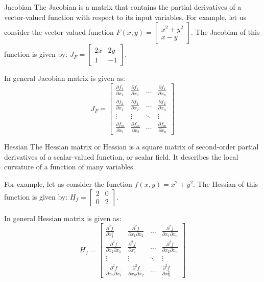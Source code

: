 \documentclass[handout]{beamer}
\begin{document}
\begin{frame}{Jacobian}
    The Jacobian is a matrix that contains the partial derivatives of a vector-valued function with respect to its input variables. 
For example, let us consider the vector valued function $F(x, y) = \begin{bmatrix} x^2 + y^2 \\ x - y \end{bmatrix}$. The Jacobian of this function is given by: $J_F = \begin{bmatrix} 2x & 2y \\ 1 & -1 \end{bmatrix}$.

In general Jacobian matrix is given as:
\begin{equation*}
    J_F = \begin{bmatrix} \frac{\partial f_1}{\partial x_1} & \frac{\partial f_1}{\partial x_2} & \dots & \frac{\partial f_1}{\partial x_n} \\ \frac{\partial f_2}{\partial x_1} & \frac{\partial f_2}{\partial x_2} & \dots & \frac{\partial f_2}{\partial x_n} \\ \vdots & \vdots & \ddots & \vdots \\ \frac{\partial f_m}{\partial x_1} & \frac{\partial f_m}{\partial x_2} & \dots & \frac{\partial f_m}{\partial x_n} \end{bmatrix}
\end{equation*}

\end{frame}

\begin{frame}{Hessian}
    The Hessian matrix or Hessian is a square matrix of second-order partial derivatives of a scalar-valued function, or scalar field. It describes the local curvature of a function of many variables.

For example, let us consider the function $f(x, y) = x^2 + y^2$. The Hessian of this function is given by: $H_f = \begin{bmatrix} 2 & 0 \\ 0 & 2 \end{bmatrix}$.

In general Hessian matrix is given as:
\begin{equation*}
    H_f = \begin{bmatrix} \frac{\partial^2 f}{\partial x_1^2} & \frac{\partial^2 f}{\partial x_1 \partial x_2} & \dots & \frac{\partial^2 f}{\partial x_1 \partial x_n} \\ \frac{\partial^2 f}{\partial x_2 \partial x_1} & \frac{\partial^2 f}{\partial x_2^2} & \dots & \frac{\partial^2 f}{\partial x_2 \partial x_n} \\ \vdots & \vdots & \ddots & \vdots \\ \frac{\partial^2 f}{\partial x_n \partial x_1} & \frac{\partial^2 f}{\partial x_n \partial x_2} & \dots & \frac{\partial^2 f}{\partial x_n^2} \end{bmatrix}
\end{equation*}

    
\end{frame}
\end{document}
